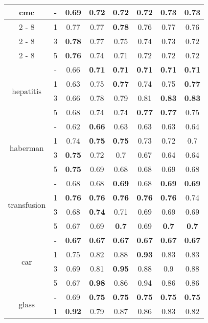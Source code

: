 \begin{table}[H]
\begin{center}
{\begin{tabular}{c|c|cccccc}
\hline%
\multirow{4}{*}{cmc}&{-}&0.69&0.72&0.72&0.72&\textbf{0.73}&\textbf{0.73}\\%
\cline{2%
	-%
	8}%
&1&0.77&0.77&\textbf{0.78}&0.76&0.77&0.76\\%
\cline{2%
	-%
	8}%
&3&\textbf{0.78}&0.77&0.75&0.74&0.73&0.72\\%
\cline{2%
	-%
	8}%
&5&\textbf{0.76}&0.74&0.71&0.72&0.72&0.72\\%
\hline%
\multirow{4}{*}{hepatitis}&{-}&0.66&\textbf{0.71}&\textbf{0.71}&\textbf{0.71}&\textbf{0.71}&\textbf{0.71}\\%
\cline{2%
	-%
	8}%
&1&0.63&0.75&\textbf{0.77}&0.74&0.75&\textbf{0.77}\\%
\cline{2%
	-%
	8}%
&3&0.66&0.78&0.79&0.81&\textbf{0.83}&\textbf{0.83}\\%
\cline{2%
	-%
	8}%
&5&0.68&0.74&0.74&\textbf{0.77}&\textbf{0.77}&0.75\\%
\hline%
\multirow{4}{*}{haberman}&{-}&0.62&\textbf{0.66}&0.63&0.63&0.63&0.64\\%
\cline{2%
	-%
	8}%
&1&0.74&\textbf{0.75}&\textbf{0.75}&0.73&0.72&0.7\\%
\cline{2%
	-%
	8}%
&3&\textbf{0.75}&0.72&0.7&0.67&0.64&0.64\\%
\cline{2%
	-%
	8}%
&5&\textbf{0.75}&0.69&0.68&0.68&0.69&0.68\\%
\hline%
\multirow{4}{*}{transfusion}&{-}&0.68&0.68&\textbf{0.69}&0.68&\textbf{0.69}&\textbf{0.69}\\%
\cline{2%
	-%
	8}%
&1&\textbf{0.76}&\textbf{0.76}&\textbf{0.76}&\textbf{0.76}&\textbf{0.76}&0.74\\%
\cline{2%
	-%
	8}%
&3&0.68&\textbf{0.74}&0.71&0.69&0.69&0.69\\%
\cline{2%
	-%
	8}%
&5&0.67&0.69&\textbf{0.7}&0.69&\textbf{0.7}&\textbf{0.7}\\%
\hline%
\multirow{4}{*}{car}&{-}&\textbf{0.67}&\textbf{0.67}&\textbf{0.67}&\textbf{0.67}&\textbf{0.67}&\textbf{0.67}\\%
\cline{2%
	-%
	8}%
&1&0.75&0.82&0.88&\textbf{0.93}&0.83&0.83\\%
\cline{2%
	-%
	8}%
&3&0.69&0.81&\textbf{0.95}&0.88&0.9&0.88\\%
\cline{2%
	-%
	8}%
&5&0.67&\textbf{0.98}&0.86&0.94&0.86&0.86\\%
\hline%
\multirow{4}{*}{glass}&{-}&0.69&\textbf{0.75}&\textbf{0.75}&\textbf{0.75}&\textbf{0.75}&\textbf{0.75}\\%
\cline{2%
	-%
	8}%
&1&\textbf{0.92}&0.79&0.87&0.86&0.83&0.82\\%

\end{tabular}}
\end{center}
\end{table}

